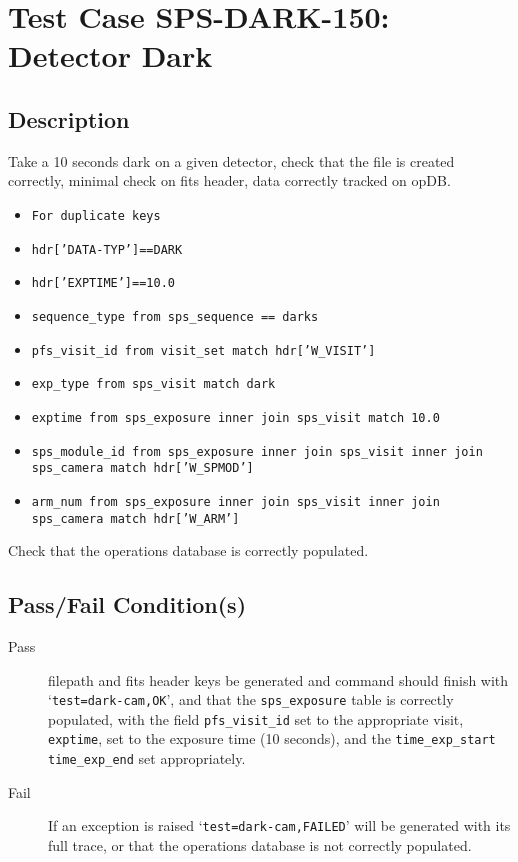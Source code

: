 \section{Test Case SPS-DARK-150: Detector Dark}

\subsection{Description}

Take a 10 seconds dark on a given detector, check that the file is created correctly, minimal check on fits header, data correctly tracked on opDB.
\begin{itemize}
\item \texttt{For duplicate keys}
\item \texttt{hdr['DATA-TYP']==DARK}
\item \texttt{hdr['EXPTIME']==10.0}
\item \texttt{sequence\_type from sps\_sequence == darks}
\item \texttt{pfs\_visit\_id from visit\_set match hdr['W\_VISIT']}
\item \texttt{exp\_type from sps\_visit match dark}
\item \texttt{exptime from sps\_exposure inner join sps\_visit match 10.0}
\item \texttt{sps\_module\_id from sps\_exposure inner join sps\_visit inner join sps\_camera match hdr['W\_SPMOD']}
\item \texttt{arm\_num from sps\_exposure inner join sps\_visit inner join sps\_camera match hdr['W\_ARM']}

\end{itemize}

Check that the operations database is correctly populated.

\subsection{Pass/Fail Condition(s)}

\begin{description}
\item [Pass] filepath and fits header keys be generated and command should finish with `\texttt{test=dark-cam,OK}', 
and that the \texttt{sps\_exposure} table is correctly populated, 
with the field \texttt{pfs\_visit\_id} set to the appropriate visit, \texttt{exptime}, 
set to the exposure time (10 seconds), and the \texttt{time\_exp\_start} \texttt{time\_exp\_end} set appropriately.

\item [Fail] If an exception is raised `\texttt{test=dark-cam,FAILED}' will be generated with its full trace, 
or that the operations database is not correctly populated.


\end{description}

